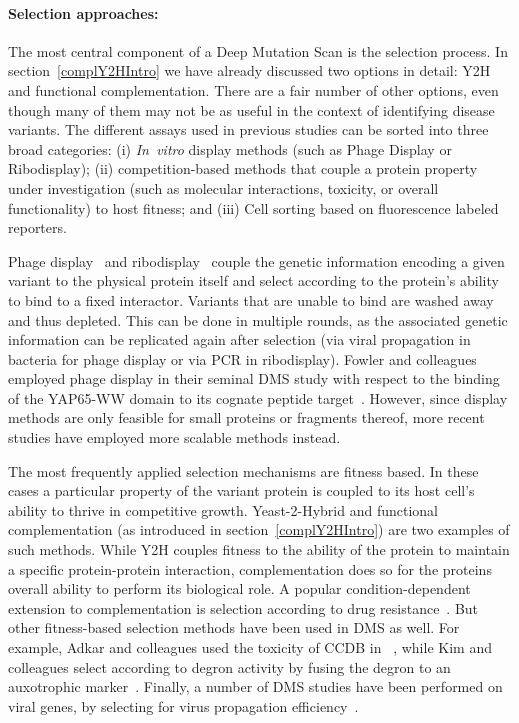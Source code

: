 \paragraph{Selection approaches:} The most central component of a Deep Mutation Scan is the selection process. In section~\ref{complY2HIntro} we have already discussed two options in detail: Y2H and functional complementation. There are a fair number of other options, even though many of them may not be as useful in the context of identifying disease variants. The different assays used in previous studies can be sorted into three broad categories: (i) \textit{In~vitro} display methods (such as Phage Display or Ribodisplay); (ii) competition-based methods that couple a protein property under investigation (such as molecular interactions, toxicity, or overall functionality) to host fitness; and (iii) Cell sorting based on fluorescence labeled reporters.

Phage display~\cite{smith_filamentous_1985} and ribodisplay~ couple the genetic information encoding a given variant to the physical protein itself and select according to the protein's ability to bind to a fixed interactor. Variants that are unable to bind are washed away and thus depleted. This can be done in multiple rounds, as the associated genetic information can be replicated again after selection (via viral propagation in bacteria for phage display or via PCR in ribodisplay). Fowler and colleagues employed phage display in their seminal DMS study with respect to the binding of the YAP65-WW domain to its cognate peptide target~\cite{fowler_high-resolution_2010}. However, since display methods are only feasible for small proteins or fragments thereof, more recent studies have employed more scalable methods instead.

The most frequently applied selection mechanisms are fitness based. In these cases a particular property of the variant protein is coupled to its host cell's ability to thrive in competitive growth. Yeast-2-Hybrid and functional complementation (as introduced in section~\ref{complY2HIntro}) are two examples of such methods. While Y2H couples fitness to the ability of the protein to maintain a specific protein-protein interaction, complementation does so for the proteins overall ability to perform its biological role. A popular condition-dependent extension to complementation is selection according to drug resistance~\cite{wu_systematic_2013,wagenaar_resistance_2014}. But other fitness-based selection methods have been used in DMS as well. For example, Adkar and colleagues used the toxicity of CCDB in ~\cite{adkar_protein_2012}, while Kim and colleagues select according to degron activity by fusing the degron to an auxotrophic marker~\cite{kim_high-throughput_2013}. Finally, a number of DMS studies have been performed on viral genes, by selecting for virus propagation efficiency~\cite{bloom_experimentally_2014,thyagarajan_inherent_2014}.

